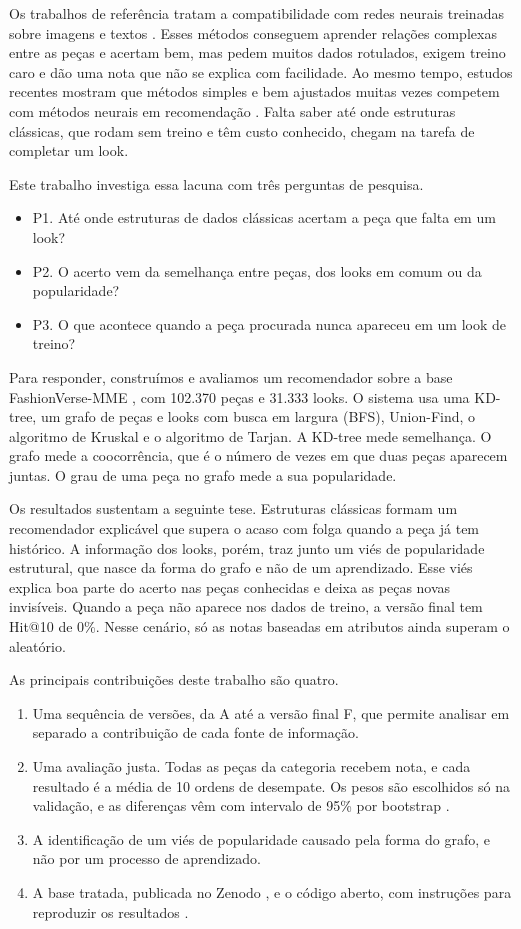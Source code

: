 \documentclass[conference]{IEEEtran}
\begin{document}
Os trabalhos de referência tratam a compatibilidade com redes neurais treinadas sobre imagens e textos \cite{han2017,vasileva2018,mcauley2015}. Esses métodos conseguem aprender relações complexas entre as peças e acertam bem, mas pedem muitos dados rotulados, exigem treino caro e dão uma nota que não se explica com facilidade. Ao mesmo tempo, estudos recentes mostram que métodos simples e bem ajustados muitas vezes competem com métodos neurais em recomendação \cite{dacrema2019}. Falta saber até onde estruturas clássicas, que rodam sem treino e têm custo conhecido, chegam na tarefa de completar um look.

Este trabalho investiga essa lacuna com três perguntas de pesquisa.
\begin{itemize}
\item P1. Até onde estruturas de dados clássicas acertam a peça que falta em um look?
\item P2. O acerto vem da semelhança entre peças, dos looks em comum ou da popularidade?
\item P3. O que acontece quando a peça procurada nunca apareceu em um look de treino?
\end{itemize}

Para responder, construímos e avaliamos um recomendador sobre a base FashionVerse-MME \cite{fashionverse}, com 102.370 peças e 31.333 looks. O sistema usa uma KD-tree, um grafo de peças e looks com busca em largura (BFS), Union-Find, o algoritmo de Kruskal e o algoritmo de Tarjan. A KD-tree mede semelhança. O grafo mede a coocorrência, que é o número de vezes em que duas peças aparecem juntas. O grau de uma peça no grafo mede a sua popularidade.

Os resultados sustentam a seguinte tese. Estruturas clássicas formam um recomendador explicável que supera o acaso com folga quando a peça já tem histórico. A informação dos looks, porém, traz junto um viés de popularidade estrutural, que nasce da forma do grafo e não de um aprendizado. Esse viés explica boa parte do acerto nas peças conhecidas e deixa as peças novas invisíveis. Quando a peça não aparece nos dados de treino, a versão final tem Hit@10 de 0\%. Nesse cenário, só as notas baseadas em atributos ainda superam o aleatório.

As principais contribuições deste trabalho são quatro.
\begin{enumerate}
\item Uma sequência de versões, da A até a versão final F, que permite analisar em separado a contribuição de cada fonte de informação.
\item Uma avaliação justa. Todas as peças da categoria recebem nota, e cada resultado é a média de 10 ordens de desempate. Os pesos são escolhidos só na validação, e as diferenças vêm com intervalo de 95\% por bootstrap \cite{efron1979}.
\item A identificação de um viés de popularidade causado pela forma do grafo, e não por um processo de aprendizado.
\item A base tratada, publicada no Zenodo \cite{zenodo}, e o código aberto, com instruções para reproduzir os resultados \cite{repositorio}.
\end{enumerate}
\end{document}
